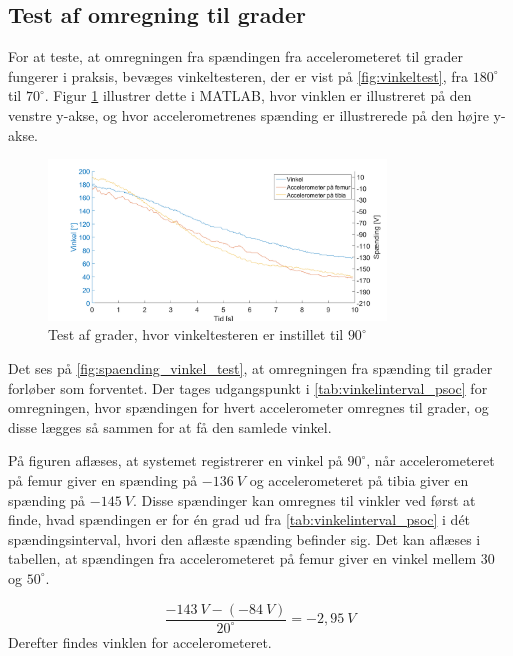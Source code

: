 \subsection{Test af omregning til grader}

For at teste, at omregningen fra spændingen fra accelerometeret til grader fungerer i praksis, bevæges vinkeltesteren, der er vist på \autoref{fig:vinkeltest}, fra $180^{\circ}$ til $70^{\circ}$. Figur \ref{fig:spaending_vinkel_test} illustrer dette i MATLAB, hvor vinklen er illustreret på den venstre y-akse, og hvor accelerometrenes spænding er illustrerede på den højre y-akse. 

\begin{figure}[H]
\centering
\includegraphics[width=0.8\textwidth]{figures/spaending_vinkel_test}
\caption{Test af grader, hvor vinkeltesteren er instillet til $90^{\circ}$ }
\label{fig:spaending_vinkel_test}
\end{figure}

\noindent
Det ses på \autoref{fig:spaending_vinkel_test}, at omregningen fra spænding til grader forløber som forventet. Der tages udgangspunkt i \autoref{tab:vinkelinterval_psoc} for omregningen, hvor spændingen for hvert accelerometer omregnes til grader, og disse lægges så sammen for at få den samlede vinkel. 

På figuren aflæses, at systemet registrerer en vinkel på $90^{\circ}$, når  accelerometeret på femur giver en spænding på $-136~V$ og accelerometeret på tibia giver en spænding på $-145~V$. Disse spændinger kan omregnes til vinkler ved først at finde, hvad spændingen er for én grad ud fra \autoref{tab:vinkelinterval_psoc}  i dét spændingsinterval, hvori den aflæste spænding befinder sig. Det kan aflæses i tabellen, at spændingen fra accelerometeret på femur giver en vinkel mellem 30 og $50^{\circ}$.

\begin{equation}
\dfrac{-143~V-(-84~V)}{20^{\circ}}=-2,95~V
\end{equation}
Derefter findes vinklen for accelerometeret.

